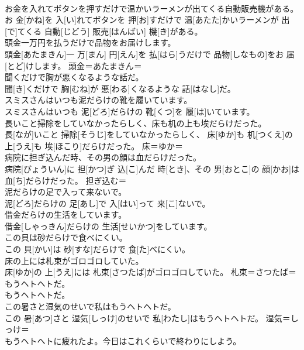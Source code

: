 \documentclass[8pt]{extreport}
\begin{document}
\begin{CJK}{UTF8}{min}
\\	お金を入れてボタンを押すだけで温かいラーメンが出てくる自動販売機がある。	
\\	お 金[かね]を 入[い]れてボタンを 押[お]すだけで 温[あたた]かいラーメンが 出[で]てくる 自動[じどう] 販売[はんばい] 機[き]がある。	
\\	頭金一万円を払うだけで品物をお届けします。	
\\	頭金[あたまきん]一 万[まん] 円[えん]を 払[はら]うだけで 品物[しなもの]をお 届[とど]けします。	頭金＝あたまきん＝ 
\\	聞くだけで胸が悪くなるような話だ。	
\\	聞[き]くだけで 胸[むね]が 悪[わる]くなるような 話[はなし]だ。	
\\	スミスさんはいつも泥だらけの靴を履いています。	
\\	スミスさんはいつも 泥[どろ]だらけの 靴[くつ]を 履[は]いています。	
\\	長いこと掃除をしていなかったらしく、床も机の上も埃だらけだった。	
\\	長[なが]いこと 掃除[そうじ]をしていなかったらしく、 床[ゆか]も 机[つくえ]の 上[うえ]も 埃[ほこり]だらけだった。	床＝ゆか＝ 
\\	病院に担ぎ込んだ時、その男の顔は血だらけだった。	
\\	病院[びょういん]に 担[かつ]ぎ 込[こ]んだ 時[とき]、その 男[おとこ]の 顔[かお]は 血[ち]だらけだった。	担ぎ込む＝ 
\\	泥だらけの足で入って来ないで。	
\\	泥[どろ]だらけの 足[あし]で 入[はい]って 来[こ]ないで。	
\\	借金だらけの生活をしています。	
\\	借金[しゃっきん]だらけの 生活[せいかつ]をしています。	
\\	この貝は砂だらけで食べにくい。	
\\	この 貝[かい]は 砂[すな]だらけで 食[た]べにくい。	
\\	床の上には札束がゴロゴロしていた。	
\\	床[ゆか]の 上[うえ]には 札束[さつたば]がゴロゴロしていた。	札束＝さつたば＝ 
\\	もうヘトヘトだ。	
\\	もうヘトヘトだ。	
\\	この暑さと湿気のせいで私はもうヘトヘトだ。	
\\	この 暑[あつ]さと 湿気[しっけ]のせいで 私[わたし]はもうヘトヘトだ。	湿気＝しっけ＝ 
\\	もうヘトヘトに疲れたよ。今日はこれくらいで終わりにしよう。	

\end{CJK}
\end{document}

